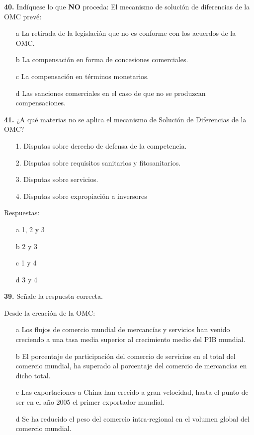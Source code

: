 \documentclass{nuevotema}
\begin{document}

\textbf{40.} Indíquese lo que \textbf{NO} proceda: El mecanismo de solución de diferencias de la OMC prevé:
\begin{itemize}
	\item[a] La retirada de la legislación que no es conforme con los acuerdos de la OMC.
	\item[b] La compensación en forma de concesiones comerciales.
	\item[c] La compensación en términos monetarios.
	\item[d] Las sanciones comerciales en el caso de que no se produzcan compensaciones.
\end{itemize}

\textbf{41.} ¿A qué materias no se aplica el mecanismo de Solución de Diferencias de la OMC?

\begin{itemize}
	\item[1.] Disputas sobre derecho de defensa de la competencia.
	\item[2.] Disputas sobre requisitos sanitarios y fitosanitarios.
	\item[3.] Disputas sobre servicios.
	\item[4.] Disputas sobre expropiación a inversores
\end{itemize}

Respuestas:

\begin{itemize}
	\item[a] 1, 2 y 3 
	\item[b] 2 y 3
	\item[c] 1 y 4
	\item[d] 3 y 4
\end{itemize}


\textbf{39.} Señale la respuesta correcta.

Desde la creación de la OMC:

\begin{itemize}
	\item[a] Los flujos de comercio mundial de mercancías y servicios han venido creciendo a una tasa media superior al crecimiento medio del PIB mundial.
	\item[b] El porcentaje de participación del comercio de servicios en el total del comercio mundial, ha superado al porcentaje del comercio de mercancías en dicho total.
	\item[c] Las exportaciones a China han crecido a gran velocidad, hasta el punto de ser en el año 2005 el primer exportador mundial.
	\item[d] Se ha reducido el peso del comercio intra-regional en el volumen global del comercio mundial.
\end{itemize}
\end{document}
